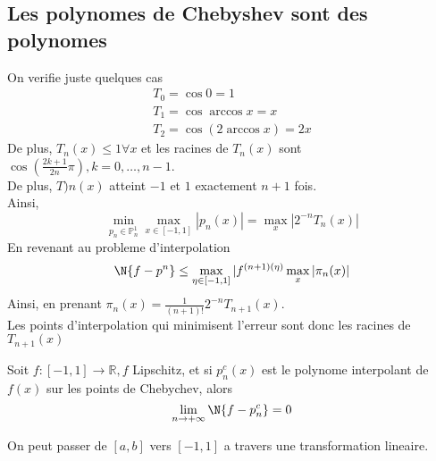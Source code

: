 \subsection*{Les polynomes de Chebyshev sont des polynomes}
On verifie juste quelques cas
\begin{align*}
T_0 = \cos 0 = 1\\
T_1 = \cos \arccos x = x\\
T_2 = \cos ( 2 \arccos x ) = 2x
\end{align*}
De plus, $T_n( x) \leq 1\forall x $ et les racines de $T_n( x) $ sont $ \cos( \frac{2k+1}{2n} \pi) , k = 0,\ldots, n-1$.\\
De plus, $T)n( x) $ atteint $-1$ et $1$ exactement $n+1$ fois.\\
Ainsi,
\[ 
	\min_{p_n \in \mathbb{P}_n^{1}} \max _{x\in [ -1,1] } |p_n( x) | = \max_x |2^{-n}T_n( x) |
\]
En revenant au probleme d'interpolation
\[ 
\N { f- p^{n}}  \leq \max_{\eta \in [-1,1] } | f^{( n+1) ( \eta) }\max_x |\pi_n( x) |
\]
Ainsi, en prenant $\pi_n( x) = \frac{1}{( n+1) !} 2^{-n}T_{n+1} ( x) $.\\
Les points d'interpolation qui minimisent l'erreur sont donc les racines de $T_{n+1} ( x) $ 
\begin{thm}
	Soit $f: [ -1,1] \to \mathbb{R}, f $ Lipschitz, et si $p_n^{c}( x) $ est le polynome interpolant de $f( x) $ sur les points de Chebychev, alors
	\[ 
	\lim_{n \to  + \infty} \N { f- p_n^{c}} = 0
	\]

\end{thm}
\begin{rmq}
On peut passer  de $ [ a,b] $ vers $ [ -1,1] $ a travers une transformation lineaire.
\end{rmq}
